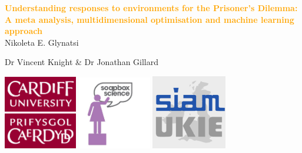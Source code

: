 \documentclass{beamer}
\begin{document}
\begin{frame}
    \begin{center}
        \large{\textbf{\textcolor{orange}{Understanding responses to environments for the Prisoner's Dilemma:
		A meta analysis, multidimensional optimisation and machine learning approach}}} \\

        \vspace{1cm}
        \normalsize{Nikoleta E. Glynatsi}

        \vspace{1cm}
        \footnotesize{Dr Vincent Knight \& Dr Jonathan Gillard}

    \end{center}
\end{frame}

\begin{frame}
    \begin{center}
    \includegraphics[width=0.24\textwidth]{static/cardiff_uni_logo.png}\hspace{6pt}
    \includegraphics[width=0.24\textwidth]{static/soapbox_image.jpg}\hspace{6pt}
    \includegraphics[width=0.245\textwidth]{static/ukie.png} \vspace{10pt}


\end{center}
\end{frame}
\end{document}
